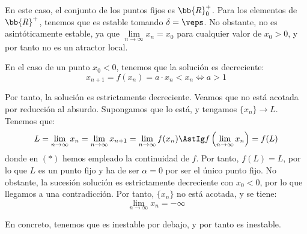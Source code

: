 \begin{ejercicio}
\begin{enumerate}
        En este caso, el conjunto de los puntos fijos es $\bb{R}^+_0$. Para los elementos de $\bb{R}^+$, tenemos que es estable tomando $\delta=\veps$. No obstante, no es asintóticamente estable, ya que $\lim\limits_{n\to \infty} x_n = x_0$ para cualquier valor de $x_0>0$, y por tanto no es un atractor local.

        En el caso de un punto $x_0<0$, tenemos que la solución es decreciente:
        \begin{equation*}
            x_{n+1} = f(x_n) = a\cdot x_n < x_n \Longleftrightarrow a> 1
        \end{equation*}
        
        Por tanto, la solución es estrictamente decreciente. Veamos que no está acotada por reducción al absurdo. Supongamos que lo está, y tengamos $\{x_n\}\to L$. Tenemos que:
        \begin{equation*}
            L = \lim_{n\to \infty} x_n = \lim_{n\to \infty} x_{n+1} 
            = \lim_{n\to \infty} f(x_n) \AstIg f\left(\lim_{n\to \infty} x_n\right) = f(L)
        \end{equation*}
        donde en $(\ast)$ hemos empleado la continuidad de $f$. Por tanto, $f(L)=L$, por lo que $L$ es un punto fijo y ha de ser $\alpha=0$ por ser el único punto fijo. No obstante, la sucesión solución es estrictamente decreciente con $x_0<0$, por lo que llegamos a una contradicción.
        Por tanto, $\{x_n\}$ no está acotada, y se tiene:
        \begin{equation*}
            \lim_{n\to \infty}x_n = -\infty
        \end{equation*}

        En concreto, tenemos que es inestable por debajo, y por tanto es inestable.
    \end{enumerate}
\end{ejercicio}

